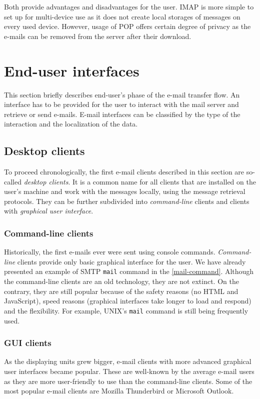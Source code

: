Both provide advantages and disadvantages for the user. IMAP is more simple to set up for multi-device use as it does not create local storages of messages on every used device. However, usage of POP offers certain degree of privacy as the e-mails can be removed from the server after their download.

\section{End-user interfaces}
This section briefly describes end-user's phase of the e-mail transfer flow. An interface has to be provided for the user to interact with the mail server and retrieve or send e-mails. E-mail interfaces can be classified by the type of the interaction and the localization of the data.

\subsection{Desktop clients}
To proceed chronologically, the first e-mail clients described in this section are so-called \emph{desktop clients}. It is a common name for all clients that are installed on the user's machine and work with the messages locally, using the message retrieval protocols. They can be further subdivided into \emph{command-line} clients and clients with \emph{graphical user interface}.

\subsubsection{Command-line clients}
Historically, the first e-mails ever were sent using console commands. \emph{Com\-mand-line} clients provide only basic graphical interface for the user. We have already presented an example of SMTP \texttt{mail} command in the \autoref{mail-command}.
Although the command-line clients are an old technology, they are not extinct. On the contrary, they are still popular because of the safety reasons (no HTML and JavaScript), speed reasons (graphical interfaces take longer to load and respond) and the flexibility. For example, UNIX's \texttt{mail} command is still being frequently used.

\subsubsection{GUI clients}
As the displaying units grew bigger, e-mail clients with more advanced graphical user interfaces became popular. These are well-known by the average e-mail users as they are more user-friendly to use than the command-line clients. Some of the most popular e-mail clients are Mozilla Thunderbird or Microsoft Outlook. 

